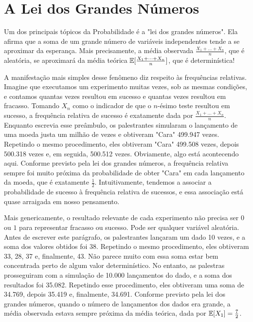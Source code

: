 


\clearpage
\section{A Lei dos Grandes Números}

Um dos principais tópicos da Probabilidade é a "lei dos grandes números".
Ela afirma que a soma de um grande número de variáveis independentes tende a se aproximar da esperança.
Mais precisamente, a média observada
$ \frac{X_1 + \dots + X_n}{n} $,
que é aleatória, se aproximará da média teórica
$ \mathbb{E}[ \frac{X_1 + \dots + X_n}{n} ] $,
que é determinística!

A manifestação mais simples desse fenômeno diz respeito às frequências relativas.
Imagine que executamos um experimento muitas vezes, sob as mesmas condições, e contamos quantas vezes resultou em sucesso e quantas vezes resultou em fracasso.
Tomando $ X_n $ como o indicador de que o $ n $-ésimo teste resultou em sucesso, a frequência relativa de sucesso é exatamente dada por
$ \frac{X_1 + \dots + X_n}{n} $.
Enquanto escrevia esse preâmbulo, os palestrantes simularam o lançamento de uma moeda justa um milhão de vezes e obtiveram "Cara" 499.947 vezes.
Repetindo o mesmo procedimento, eles obtiveram "Cara" 499.508 vezes, depois 500.318 vezes e, em seguida, 500.512 vezes.
Obviamente, algo está acontecendo aqui.
Conforme previsto pela lei dos grandes números, a frequência relativa sempre foi muito próxima da probabilidade de obter "Cara" em cada lançamento da moeda, que é exatamente $ \frac{1}{2} $.
Intuitivamente, tendemos a associar a probabilidade de sucesso à frequência relativa de sucessos, e essa associação está quase arraigada em nosso pensamento.

Mais genericamente, o resultado relevante de cada experimento não precisa ser $ 0 $ ou $ 1 $ para representar fracasso ou sucesso. Pode ser qualquer variável aleatória.
Antes de escrever este parágrafo, os palestrantes lançaram um dado 10 vezes, e a soma dos valores obtidos foi 38.
Repetindo o mesmo procedimento, eles obtiveram 33, 28, 37 e, finalmente, 43.
Não parece muito com essa soma estar bem concentrada perto de algum valor determinístico.
No entanto, as palestras prosseguiram com a simulação de 10.000 lançamentos do dado, e a soma dos resultados foi 35.082.
Repetindo esse procedimento, eles obtiveram uma soma de 34.769, depois 35.419 e, finalmente, 34.691.
Conforme previsto pela lei dos grandes números, quando o número de lançamentos dos dados era grande, a média observada estava sempre próxima da média teórica, dada por $ \mathbb{E}[X_1]=\frac{7}{2} $.

